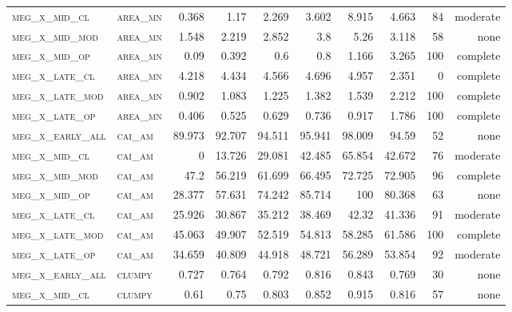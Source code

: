 \begin{landscape}
\begin{center}
\begin{footnotesize}
\begin{longtable}{llrrrrr|rrr}
\textsc{meg\_x\_mid\_cl   } & \textsc{area\_mn  }    & 0.368    & 1.17     & 2.269    & 3.602    & 8.915    & 4.663    & 84  & moderate \\
\textsc{meg\_x\_mid\_mod  } & \textsc{area\_mn  }    & 1.548    & 2.219    & 2.852    & 3.8      & 5.26     & 3.118    & 58  & none     \\
\textsc{meg\_x\_mid\_op   } & \textsc{area\_mn  }    & 0.09     & 0.392    & 0.6      & 0.8      & 1.166    & 3.265    & 100 & complete \\
\textsc{meg\_x\_late\_cl  } & \textsc{area\_mn  }    & 4.218    & 4.434    & 4.566    & 4.696    & 4.957    & 2.351    & 0   & complete \\
\textsc{meg\_x\_late\_mod } & \textsc{area\_mn  }    & 0.902    & 1.083    & 1.225    & 1.382    & 1.539    & 2.212    & 100 & complete \\
\textsc{meg\_x\_late\_op  } & \textsc{area\_mn  }    & 0.406    & 0.525    & 0.629    & 0.736    & 0.917    & 1.786    & 100 & complete \\
\textsc{meg\_x\_early\_all} & \textsc{cai\_am   }    & 89.973   & 92.707   & 94.511   & 95.941   & 98.009   & 94.59    & 52  & none     \\
\textsc{meg\_x\_mid\_cl   } & \textsc{cai\_am   }    & 0        & 13.726   & 29.081   & 42.485   & 65.854   & 42.672   & 76  & moderate \\
\textsc{meg\_x\_mid\_mod  } & \textsc{cai\_am   }    & 47.2     & 56.219   & 61.699   & 66.495   & 72.725   & 72.905   & 96  & complete \\
\textsc{meg\_x\_mid\_op   } & \textsc{cai\_am   }    & 28.377   & 57.631   & 74.242   & 85.714   & 100      & 80.368   & 63  & none     \\
\textsc{meg\_x\_late\_cl  } & \textsc{cai\_am   }    & 25.926   & 30.867   & 35.212   & 38.469   & 42.32    & 41.336   & 91  & moderate \\
\textsc{meg\_x\_late\_mod } & \textsc{cai\_am   }    & 45.063   & 49.907   & 52.519   & 54.813   & 58.285   & 61.586   & 100 & complete \\
\textsc{meg\_x\_late\_op  } & \textsc{cai\_am   }    & 34.659   & 40.809   & 44.918   & 48.721   & 56.289   & 53.854   & 92  & moderate \\
\textsc{meg\_x\_early\_all} & \textsc{clumpy    }    & 0.727    & 0.764    & 0.792    & 0.816    & 0.843    & 0.769    & 30  & none     \\
\textsc{meg\_x\_mid\_cl   } & \textsc{clumpy    }    & 0.61     & 0.75     & 0.803    & 0.852    & 0.915    & 0.816    & 57  & none     \\

\end{longtable}
\end{footnotesize}
\end{center}
\end{landscape}
